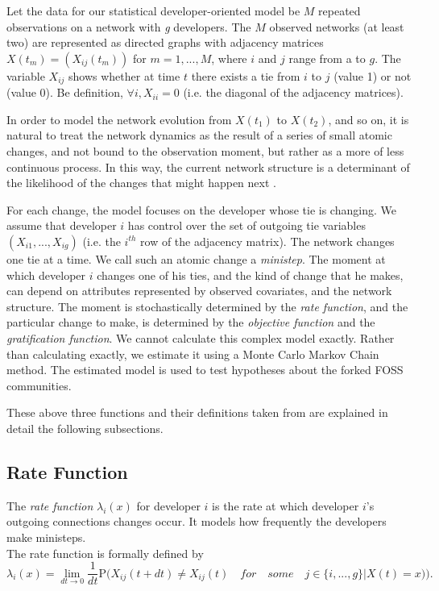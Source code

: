 \documentclass[12pt,letterpaper]{gthesis2}  %
\begin{document}
Let the data for our statistical developer-oriented model be $M$ repeated observations on a network with \textit{g} developers. The $M$ observed networks (at least two) are represented as directed graphs with adjacency matrices $X(t_m) = (X_{ij}(t_m))$ for $m = 1,...,M$, where $i$ and $j$ range from a to $g$. The variable $X_{ij}$ shows whether at time $t$ there exists a tie from $i$ to $j$ (value 1) or not (value 0). Be definition, $\forall i, X_{ii}=0$ (i.e. the diagonal of the adjacency matrices).

In order to model the network evolution from $X(t_1)$ to $X(t_2)$, and so on, it is natural to treat the network dynamics as the result of a series of small atomic changes, and not bound to the observation moment, but rather as a more of less continuous process. In this way, the current network structure is a determinant of the likelihood of the changes that might happen next \cite{Coleman1964}. 

For each change, the model focuses on the developer whose tie is changing. We assume that developer $i$ has control over the set of outgoing  tie variables $(X_{i1}, ..., X_{ig})$ (i.e. the $i^{th}$ row of the adjacency matrix). The network changes one tie at a time. We call such an atomic change a \textit{ministep}. The moment at which developer $i$ changes one of his ties, and the kind of change that he makes, can depend on attributes represented by observed covariates, and the network structure. The moment is stochastically determined by the \textit{rate function}, and the particular change to make, is determined by the \textit{objective function} and the \textit{gratification function}. We cannot calculate this complex model exactly. Rather than calculating exactly, we estimate it using a Monte Carlo Markov Chain method. The estimated model is used to test hypotheses about the forked FOSS communities. 

These above three functions and their definitions taken from \cite{Snijders2004} are explained in detail the following subsections.

\subsection*{Rate Function}

The \textit{rate function} $\lambda_i(x)$ for developer $i$ is the rate at which developer $i$'s outgoing connections changes occur. It models how frequently the developers make ministeps.\\
The rate function is formally defined \cite{Snijders2004} by
\begin{equation}
\lambda_i(x) = \lim_{dt \to 0} \frac{1}{dt} \mathrm {P} \big({X_{ij}(t + dt) \neq X_{ij}(t) \quad for \quad some \quad j \in \{i, ..., g\} | X(t) = x)}\big).
\end{equation}
\end{document}

